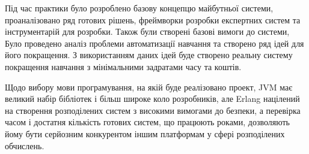 
Під час практики було розроблено базову концепцю майбутньої системи,
проаналізовано ряд готових рішень, фреймворки розробки експертних
систем та інструментарій для розробки.
Також були створені базові вимоги до системи,
Було проведено аналіз проблеми автоматизації навчання та створено ряд ідей для
його покращення. 
З використанням даних ідей буде створено реальну систему покращення навчання з
мінімальними задратами часу та коштів.

Щодо вибору мови програмування, на якій буде реалізовано проект, JVM має
великий набір бібліотек і більш широке коло розробників, але Erlang націлений
на створення розподілених систем з високими вимогами до безпеки, а перевірка
часом і достатня кількість готових систем, що працюють роками, дозволяють
йому бути серйозним конкурентом іншим платформам у сфері розподілених
обчислень.
